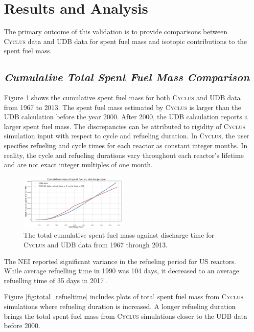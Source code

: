 \documentclass{anstrans}
\newcommand{\Cyclus}{\textsc{Cyclus}\xspace}%
\begin{document}
\section{Results and Analysis}
The primary outcome of this validation is to provide comparisons between 
\Cyclus data and \gls{UDB} data for spent fuel mass and isotopic contributions to the 
spent fuel mass. 

\subsection{\textit{Cumulative Total Spent Fuel Mass Comparison}}
Figure \ref{fig:total_original} shows the cumulative spent fuel mass for both 
\Cyclus and \gls{UDB} data from 1967 to 2013. The spent fuel mass estimated by 
\Cyclus is larger than the \gls{UDB} calculation before the year 2000. After 2000,
the \gls{UDB} calculation reports a larger spent fuel mass. The discrepancies can be 
attributed to rigidity of \Cyclus simulation input with respect to cycle and 
refueling duration. In \Cyclus, the user specifies refueling and cycle times for each 
reactor as constant integer months.  In reality, the cycle and refueling durations 
vary throughout each reactor's lifetime and are not exact integer multiples of 
one month. 

\begin{figure}[t] %
	\centering
	\includegraphics[width=0.48\textwidth]{figures/total_cumulative_mass_spent_fuel_original}
	\caption{The total cumulative spent fuel mass against discharge time for \Cyclus and \gls{UDB} data from 1967 through 2013.}
	\label{fig:total_original}
\end{figure}

The \gls{NEI} reported significant 
variance in the refueling period for \gls{US} reactors. While average 
refuelling time in 1990 was 104 days, it decreased to an average 
refuelling time of 35 days in 2017 \cite{iaea_current_nodate}.

Figure \ref{fig:total_refueltime} includes plots of total spent fuel mass from 
\Cyclus simulations where refueling duration is increased. A longer refueling duration brings 
the total spent fuel mass from \Cyclus simulations closer to the \gls{UDB} data 
before 2000. 
\end{document}
